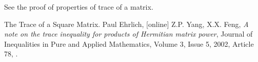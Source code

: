 \documentclass{article}
\begin{document}
See the proof of properties of trace of a matrix.

\begin{thebibliography}{9}
The Trace of a Square Matrix. Paul Ehrlich, [online] 
Z.P. Yang,  X.X. Feng, \emph{A note on the trace inequality for 
products of Hermitian matrix power},
Journal of Inequalities in Pure and Applied Mathematics,
Volume 3,  Issue 5, 2002, Article 78, 
.
\end{thebibliography}
\end{document}
